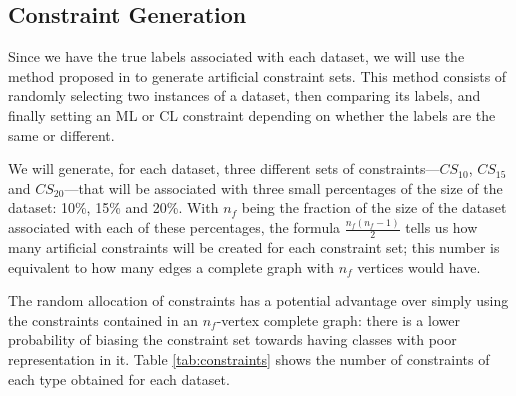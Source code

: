 \documentclass[review]{elsarticle}
\begin{document}
\subsection{Constraint Generation} \label{sec:ConstGent}

Since we have the true labels associated with each dataset, we will use the method proposed in \cite{wagstaff2001constrained} to generate artificial constraint sets. This method consists of randomly selecting two instances of a dataset, then comparing its labels, and finally setting an ML or CL constraint depending on whether the labels are the same or different.

We will generate, for each dataset, three different sets of constraints---$CS_{10}$, $CS_{15}$ and $CS_{20}$---that will be associated with three small percentages of the size of the dataset: 10\%, 15\% and 20\%. With $n_f$ being the fraction of the size of the dataset associated with each of these percentages, the formula $\frac{n_f(n_f-1)}{2}$ tells us how many artificial constraints will be created for each constraint set; this number is equivalent to how many edges a complete graph with $n_f$ vertices would have.

The random allocation of constraints has a potential advantage over simply using the constraints contained in an $n_f$-vertex complete graph: there is a lower probability of biasing the constraint set towards having classes with poor representation in it. Table \ref{tab:constraints} shows the number of constraints of each type obtained for each dataset.
\end{document}
